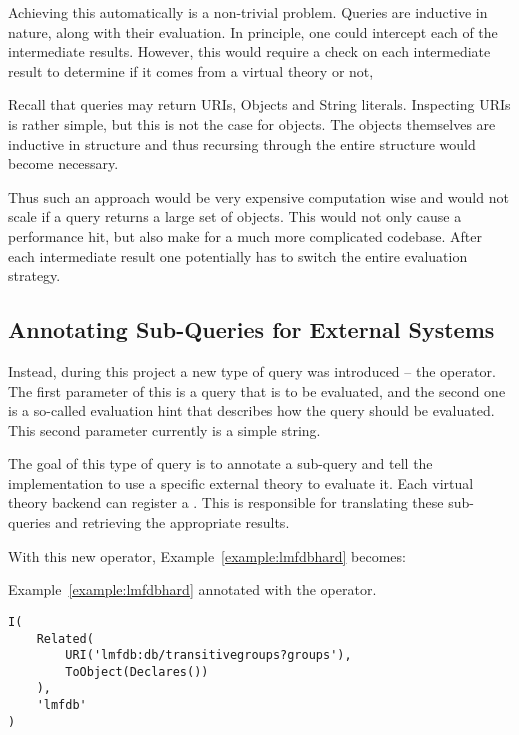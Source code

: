 Achieving this automatically is a non-trivial problem. 
Queries are inductive in nature, along with their evaluation. 
In principle, one could intercept each of the intermediate results. 
However, this would require a check on each intermediate result to determine if it comes from a virtual theory or not, 

Recall that queries may return URIs, Objects and String literals. 
Inspecting URIs is rather simple, but this is not the case for objects. 
The objects themselves are inductive in structure and thus recursing through the entire structure would become necessary. 

Thus such an approach would be very expensive computation wise and would not scale if a query returns a large set of objects. 
This would not only cause a performance hit, but also make for a much more complicated codebase. 
After each intermediate result one potentially has to switch the entire evaluation strategy.

\subsection{Annotating Sub-Queries for External Systems}\label{sec:comm:iop}

Instead, during this project a new type of query was introduced -- the  operator.
The first parameter of this is a query that is to be evaluated, and the second one is a so-called evaluation hint that describes how the query should be evaluated.
This second parameter currently is a simple string. 

The goal of this type of query is to annotate a sub-query and tell the implementation to use a specific external theory to evaluate it. 
Each virtual theory backend can register a . 
This is responsible for translating these sub-queries and retrieving the appropriate results. 

With this new operator, Example~\ref{example:lmfdbhard} becomes:

\begin{example}\label{example:lmfdbhint}
  Example~\ref{example:lmfdbhard} annotated with the  operator. 
	\begin{lstlisting}[language=qmt]
I(
	Related(
		URI('lmfdb:db/transitivegroups?groups'),
		ToObject(Declares())
	), 
	'lmfdb'
)
	\end{lstlisting}
\end{example}

